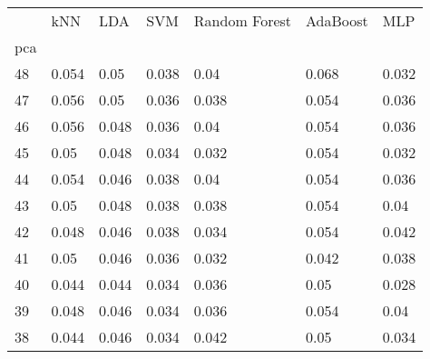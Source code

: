 \begin{tabular}{lllllll}
\toprule
{} &    kNN &    LDA &    SVM & Random Forest & AdaBoost &    MLP \\
pca &        &        &        &               &          &        \\
\midrule
48  &  0.054 &   0.05 &  0.038 &          0.04 &    0.068 &  0.032 \\
47  &  0.056 &   0.05 &  0.036 &         0.038 &    0.054 &  0.036 \\
46  &  0.056 &  0.048 &  0.036 &          0.04 &    0.054 &  0.036 \\
45  &   0.05 &  0.048 &  0.034 &         0.032 &    0.054 &  0.032 \\
44  &  0.054 &  0.046 &  0.038 &          0.04 &    0.054 &  0.036 \\
43  &   0.05 &  0.048 &  0.038 &         0.038 &    0.054 &   0.04 \\
42  &  0.048 &  0.046 &  0.038 &         0.034 &    0.054 &  0.042 \\
41  &   0.05 &  0.046 &  0.036 &         0.032 &    0.042 &  0.038 \\
40  &  0.044 &  0.044 &  0.034 &         0.036 &     0.05 &  0.028 \\
39  &  0.048 &  0.046 &  0.034 &         0.036 &    0.054 &   0.04 \\
38  &  0.044 &  0.046 &  0.034 &         0.042 &     0.05 &  0.034 \\
\bottomrule
\end{tabular}
